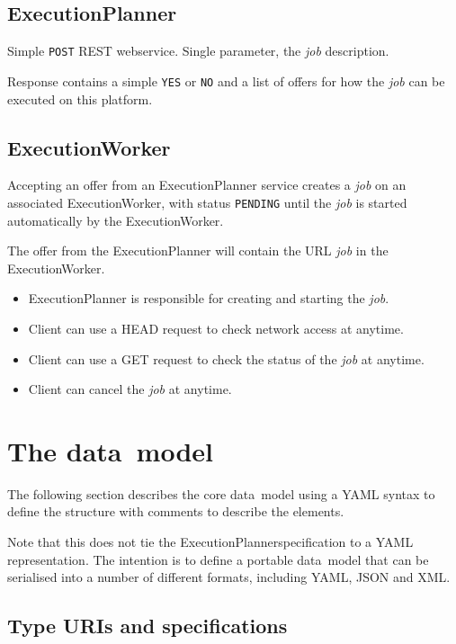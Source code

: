 \documentclass[11pt,a4paper]{ivoa}
\newcommand{\datamodel} {data~model}
\newcommand{\execplanner} {ExecutionPlanner}
\newcommand{\execworker} {ExecutionWorker}
\newcommand{\codeword}[1] {\texttt{#1}}
\newcommand{\job} {\textit{job}}
\begin{document}
\subsection{ExecutionPlanner}
\label{execution-planner-spec}

Simple \codeword{POST} REST webservice.
Single parameter, the \job{} description.

Response contains a simple \codeword{YES} or \codeword{NO}
and a list of offers for how the \job{} can be executed on this platform.

\subsection{ExecutionWorker}
\label{execution-worker-spec}

Accepting an offer from an \execplanner{} service creates a \job{} on an associated \execworker{},
with status \codeword{PENDING} until the \job{} is started automatically by the \execworker{}.

The offer from the \execplanner{} will contain the URL \job{} in the \execworker{}.

\begin{itemize}
    \item \execplanner{} is responsible for creating and starting the \job{}.
    \item Client can use a HEAD request to check network access at anytime.
    \item Client can use a GET request to check the status of the \job{} at anytime.
    \item Client can cancel the \job{} at anytime.
\end{itemize}

\pagebreak

\section{The \datamodel{}}
\label{datamodel}

The following section describes the core \datamodel{} using a YAML syntax
to define the structure with comments to describe the elements.

Note that this does not tie the \execplanner specification to a YAML representation.
The intention is to define a portable \datamodel{} that can be serialised
into a number of different formats, including YAML, JSON and XML.

\subsection{Type URIs and specifications}
\label{type-and-spec}
\end{document}
